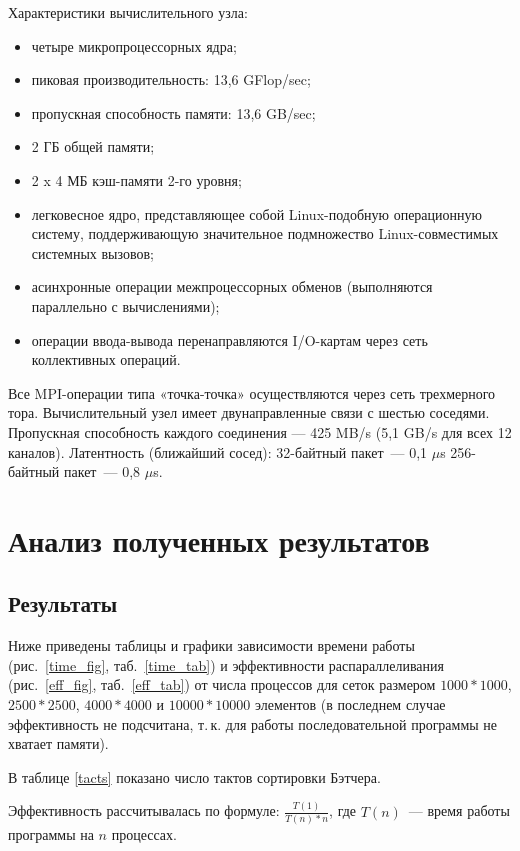 \documentclass[oneside,final,14pt]{extreport}
\begin{document}
Характеристики вычислительного узла:

\begin{itemize}
    \item четыре микропроцессорных ядра;
    \item пиковая производительность: 13,6 GFlop/sec;
    \item пропускная способность памяти: 13,6 GB/sec;
    \item 2 ГБ общей памяти;
    \item 2 x 4 МБ кэш-памяти 2-го уровня;
    \item легковесное ядро, представляющее собой Linux-подобную операционную систему,
        поддерживающую значительное подмножество Linux-совместимых системных вызовов;
    \item асинхронные операции межпроцессорных обменов (выполняются параллельно с вычислениями);
    \item операции ввода-вывода перенаправляются I/O-картам через сеть коллективных операций.
\end{itemize}

Все MPI-операции типа «точка-точка» осуществляются через сеть трехмерного тора.
Вычислительный узел имеет двунаправленные связи с шестью соседями.
Пропускная способность каждого соединения — 425 MB/s (5,1 GB/s для всех 12
каналов). Латентность (ближайший сосед): 32-байтный пакет~--- 0,1 $\mu$s
256-байтный пакет~--- 0,8 $\mu$s.

\chapter*{Анализ полученных результатов}

\section*{Результаты}

Ниже приведены таблицы и графики зависимости времени работы (рис.~\ref{time_fig},
таб.~\ref{time_tab})
и эффективности распараллеливания (рис.~\ref{eff_fig}, таб.~\ref{eff_tab})
от числа процессов для сеток размером $1000*1000$,
$2500*2500$, $4000*4000$ и $10000*10000$ элементов (в последнем случае
эффективность не подсчитана, т.\,к. для работы последовательной программы
не хватает памяти).

В таблице \ref{tacts} показано число тактов сортировки Бэтчера.

Эффективность рассчитывалась по формуле: $\frac{T(1)}{T(n)*n}$,
где $T(n)$~--- время работы программы на $n$ процессах.
\end{document}
